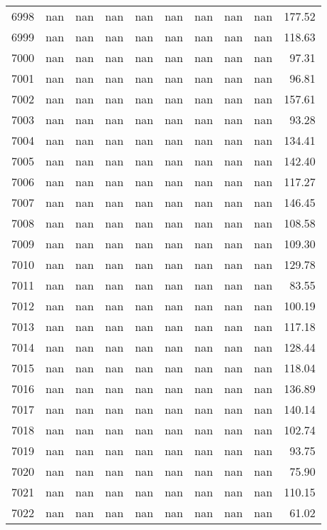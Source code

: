 \begin{tabular}{lrrrrrrrrr}
6998 & nan & nan & nan & nan & nan & nan & nan & nan & 177.52 \\
6999 & nan & nan & nan & nan & nan & nan & nan & nan & 118.63 \\
7000 & nan & nan & nan & nan & nan & nan & nan & nan & 97.31 \\
7001 & nan & nan & nan & nan & nan & nan & nan & nan & 96.81 \\
7002 & nan & nan & nan & nan & nan & nan & nan & nan & 157.61 \\
7003 & nan & nan & nan & nan & nan & nan & nan & nan & 93.28 \\
7004 & nan & nan & nan & nan & nan & nan & nan & nan & 134.41 \\
7005 & nan & nan & nan & nan & nan & nan & nan & nan & 142.40 \\
7006 & nan & nan & nan & nan & nan & nan & nan & nan & 117.27 \\
7007 & nan & nan & nan & nan & nan & nan & nan & nan & 146.45 \\
7008 & nan & nan & nan & nan & nan & nan & nan & nan & 108.58 \\
7009 & nan & nan & nan & nan & nan & nan & nan & nan & 109.30 \\
7010 & nan & nan & nan & nan & nan & nan & nan & nan & 129.78 \\
7011 & nan & nan & nan & nan & nan & nan & nan & nan & 83.55 \\
7012 & nan & nan & nan & nan & nan & nan & nan & nan & 100.19 \\
7013 & nan & nan & nan & nan & nan & nan & nan & nan & 117.18 \\
7014 & nan & nan & nan & nan & nan & nan & nan & nan & 128.44 \\
7015 & nan & nan & nan & nan & nan & nan & nan & nan & 118.04 \\
7016 & nan & nan & nan & nan & nan & nan & nan & nan & 136.89 \\
7017 & nan & nan & nan & nan & nan & nan & nan & nan & 140.14 \\
7018 & nan & nan & nan & nan & nan & nan & nan & nan & 102.74 \\
7019 & nan & nan & nan & nan & nan & nan & nan & nan & 93.75 \\
7020 & nan & nan & nan & nan & nan & nan & nan & nan & 75.90 \\
7021 & nan & nan & nan & nan & nan & nan & nan & nan & 110.15 \\
7022 & nan & nan & nan & nan & nan & nan & nan & nan & 61.02 \\

\end{tabular}
